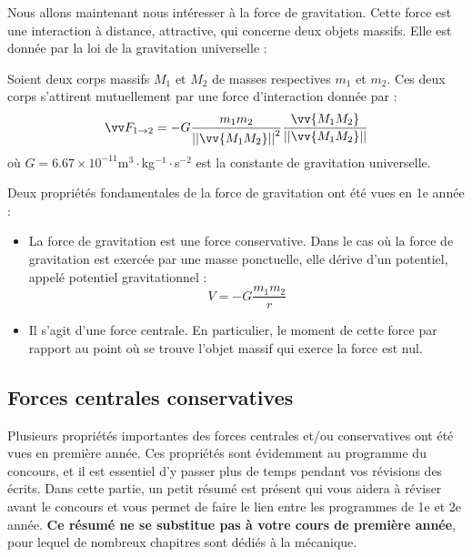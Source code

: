 \documentclass[11pt,fleqn]{book} %
\begin{document}
Nous allons maintenant nous intéresser à la force de gravitation. Cette force est une interaction à distance, attractive, qui concerne deux objets massifs. Elle est donnée par la loi de la gravitation universelle :

\begin{theorem}
    Soient deux corps massifs $M_1$ et $M_2$ de masses respectives $m_1$ et $m_2$. Ces deux corps s'attirent mutuellement par une force d'interaction donnée par :
    \begin{equation}
        \vv F_{1 \rightarrow 2} = - G \dfrac{m_1 m_2}{\left|\left|\vv{M_1 M_2}\right|\right|^2} \dfrac{\vv{M_1 M_2}}{\left|\left|\vv{M_1 M_2}\right|\right|}
    \end{equation}
    où $G = 6.67\times10^{-11}$m$^3 \cdot$kg$^{-1}\cdot$s$^{-2}$ est la constante de gravitation universelle.
\end{theorem}

Deux propriétés fondamentales de la force de gravitation ont été vues en 1e année :
\begin{itemize}
    \item La force de gravitation est une force conservative. Dans le cas où la force de gravitation est exercée par une masse ponctuelle, elle dérive d'un potentiel, appelé potentiel gravitationnel :
    \begin{equation}
        V = -G \frac{m_1 m_2}{r}
    \end{equation}
    \item Il s'agit d'une force centrale. En particulier, le moment de cette force par rapport au point où se trouve l'objet massif qui exerce la force est nul.
\end{itemize}

\subsection{Forces centrales conservatives}

Plusieurs propriétés importantes des forces centrales et/ou conservatives ont été vues en première année. Ces propriétés sont évidemment au programme du concours, et il est essentiel d'y passer plus de temps pendant vos révisions des écrits. Dans cette partie, un petit résumé est présent qui vous aidera à réviser avant le concours et vous permet de faire le lien entre les programmes de 1e et 2e année. \textbf{Ce résumé ne se substitue pas à votre cours de première année}, pour lequel de nombreux chapitres sont dédiés à la mécanique.
\end{document}
